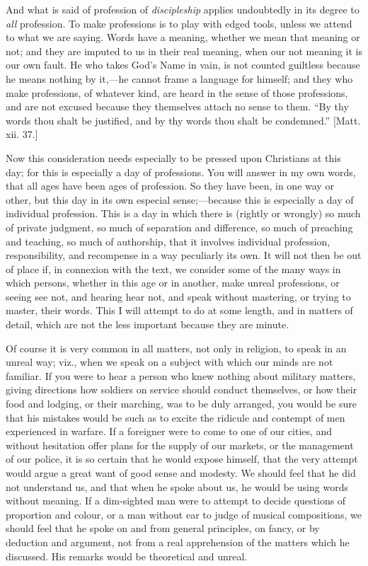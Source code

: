 And what is said of profession of \emph{discipleship} applies
undoubtedly in its degree to \emph{all} profession. To make
professions is to play with edged tools, unless we attend to what we
are saying. Words have a meaning, whether we mean that meaning or not;
and they are imputed to us in their real meaning, when our not meaning
it is our own fault. He who takes God's Name in vain, is not counted
guiltless because he means nothing by it,—he cannot frame a language
for himself; and they who make professions, of whatever kind, are
heard in the sense of those professions, and are not excused because
they themselves attach no sense to them. ``By thy words thou shalt
be justified, and by thy words thou shalt be condemned.'' [Matt.
xii. 37.]

Now this consideration needs especially to be pressed upon
Christians at this day; for this is especially a day of professions.
You will answer in my own words, that all ages have been ages of
profession. So they have been, in one way or other, but this day in
its own especial sense;—because this is especially a day of
individual profession. This is a day in which there is (rightly or
wrongly) so much of private judgment, so much of separation and
difference, so much of preaching and teaching, so much of authorship,
that it involves individual profession, responsibility, and recompense
in a way peculiarly its own. It will not then be out of place if, in
connexion with the text, we consider some of the many ways in which
persons, whether in this age or in another, make unreal professions,
or seeing see not, and hearing hear not, and speak without mastering,
or trying to master, their words. This I will attempt to do at some
length, and in matters of detail, which are not the less important
because they are minute.

Of course it is very common in all matters, not only in religion,
to speak in an unreal way; viz., when we speak on a subject with
which our minds are not familiar. If you were to hear a person who
knew nothing about military matters, giving directions how soldiers on
service should conduct themselves, or how their food and lodging, or
their marching, was to be duly arranged, you would be sure that his
mistakes would be such as to excite the ridicule and contempt of men
experienced in warfare. If a foreigner were to come to one of our
cities, and without hesitation offer plans for the supply of our
markets, or the management of our police, it is so certain that he
would expose himself, that the very attempt would argue a great want
of good sense and modesty. We should feel that he did not understand
us, and that when he spoke about us, he would be using words without
meaning. If a dim-sighted man were to attempt to decide questions of
proportion and colour, or a man without ear to judge of musical
compositions, we should feel that he spoke on and from general
principles, on fancy, or by deduction and argument, not from a real
apprehension of the matters which he discussed. His remarks would be
theoretical and unreal.

